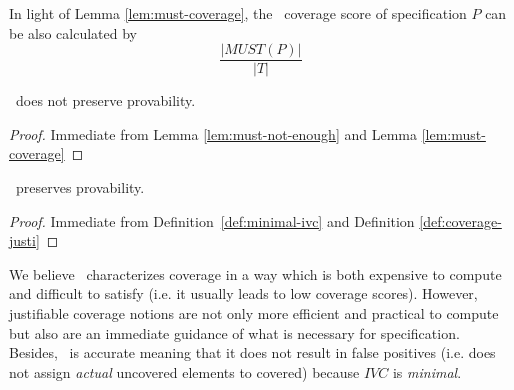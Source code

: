 In light of Lemma \ref{lem:must-coverage}, the \nondetcov\ coverage score of specification $P$ can be also calculated by
$$\frac{|MUST(P)|}{|T|}$$
\vspace{0.2in}


%
\begin{coroll}
\label{cor:must-not-provable}
\nondetcov\ does not preserve provability. 
\end{coroll}
\begin{proof}
Immediate from Lemma \ref{lem:must-not-enough} and Lemma \ref{lem:must-coverage} 
\end{proof}
\vspace{2mm}
\begin{coroll}
\label{cor:ivc-provable}
\ivccov\ preserves provability.
\end{coroll}
\begin{proof}
Immediate from Definition~\ref{def:minimal-ivc} and Definition \ref{def:coverage-justi}
\end{proof}
\vspace{2mm}
We believe \nondetcov\ characterizes coverage in a way which is both expensive to compute and difficult to satisfy (i.e. it usually leads to low coverage scores). However, justifiable coverage notions are not only more efficient and practical to compute but also are an immediate guidance of what is necessary for specification.
Besides, \ivccov\ is accurate meaning that it does not result in false positives (i.e. does not assign \emph{actual} uncovered elements to covered) because $IVC$ is \emph{minimal}.




